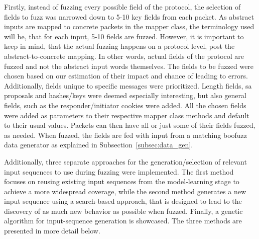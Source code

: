 Firstly, instead of fuzzing every possible field of the protocol, the selection of fields to fuzz was narrowed down to 5-10 key fields from each packet. As abstract inputs are mapped to concrete packets in the mapper class, the terminology used will be, that for each input, 5-10 fields are fuzzed. However, it is important to keep in mind, that the actual fuzzing happens on a protocol level, post the abstract-to-concrete mapping. In other words, actual fields of the protocol are fuzzed and not the abstract input words themselves. The fields to be fuzzed were chosen based on our estimation of their impact and chance of leading to errors. Additionally, fields unique to specific messages were prioritized. Length fields, \ac{sa} proposals and hashes/keys were deemed especially interesting, but also general fields, such as the responder/initiator cookies were added. All the chosen fields were added as parameters to their respective mapper class methods and default to their usual values. Packets can then have all or just some of their fields fuzzed, as needed. When fuzzed, the fields are fed with input from a matching boofuzz data generator as explained in Subsection~\ref{subsec:data_gen}.

Additionally, three separate approaches for the generation/selection of relevant input sequences to use during fuzzing were implemented. The first method focuses on reusing existing input sequences from the model-learning stage to achieve a more widespread coverage, while the second method generates a new input sequence using a search-based approach, that is designed to lead to the discovery of as much new behavior as possible when fuzzed. Finally, a genetic algorithm for input-sequence generation is showcased. The three methods are presented in more detail below.

